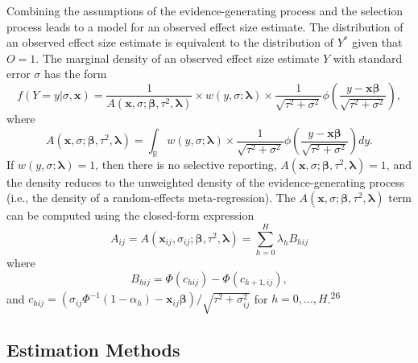 \documentclass[
  man, donotrepeattitle,floatsintext]{apa7}
\begin{document}
Combining the assumptions of the evidence-generating process and the selection process leads to a model for an observed effect size estimate. The distribution of an observed effect size estimate is equivalent to the distribution of \(Y^*\) given that \(O = 1\).
The marginal density of an observed effect size estimate \(Y\) with standard error \(\sigma\) has the form
\begin{equation}
\label{eq:generic-selection}
f(Y = y | \sigma, \mathbf{x}) = \frac{1}{A(\mathbf{x}, \sigma; \boldsymbol\beta, \tau^2, \boldsymbol\lambda)} \times w\left(y, \sigma; \boldsymbol\lambda \right) \times \frac{1}{\sqrt{\tau^2 + \sigma^2}} \phi\left(\frac{y - \mathbf{x} \boldsymbol\beta}{\sqrt{\tau^2 + \sigma^2}}\right),
\end{equation}
where
\begin{equation}
\label{eq:generic-selection-A}
A(\mathbf{x}, \sigma; \boldsymbol\beta, \tau^2, \boldsymbol\lambda) =  \int_\mathbb{R} w\left(y, \sigma; \boldsymbol\lambda \right) \times  \frac{1}{\sqrt{\tau^2 + \sigma^2}}\phi\left(\frac{y - \mathbf{x}\boldsymbol\beta}{\sqrt{\tau^2 + \sigma^2}}\right) dy.
\end{equation}
If \(w(y, \sigma; \boldsymbol\lambda) = 1\), then there is no selective reporting, \(A(\mathbf{x}, \sigma; \boldsymbol\beta, \tau^2, \boldsymbol\lambda) = 1\), and the density reduces to the unweighted density of the evidence-generating process (i.e., the density of a random-effects meta-regression).
The \(A(\mathbf{x}, \sigma; \boldsymbol\beta, \tau^2, \boldsymbol\lambda)\) term can be computed using the closed-form expression
\begin{equation}
\label{eq:step-function-A}
A_{ij} = A(\mathbf{x}_{ij}, \sigma_{ij}; \boldsymbol\beta, \tau^2, \boldsymbol\lambda) = \sum_{h=0}^H \lambda_h B_{hij}
\end{equation}
where
\begin{equation}
\label{eq:step-function-Bhij}
B_{hij} = \Phi\left(c_{hij}\right) - \Phi\left(c_{h+1,ij}\right),
\end{equation}
and \(c_{hij} = \left(\sigma_{ij} \Phi^{-1}\left(1 - \alpha_h\right) - \mathbf{x}_{ij}\boldsymbol\beta\right) / \sqrt{\tau^2 + \sigma_{ij}^2}\) for \(h = 0,...,H\).\textsuperscript{26}

\subsection{Estimation Methods}\label{estimation-methods}
\end{document}
